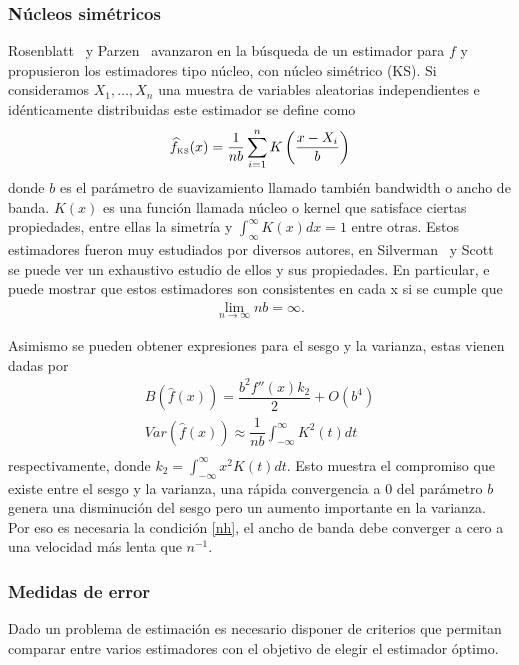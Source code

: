 \subsubsection{Núcleos simétricos}
Rosenblatt~\cite{Rosenblatt56}  y Parzen~\cite{Parzen62} avanzaron en la búsqueda de un estimador para $f$ y propusieron los estimadores tipo núcleo, con núcleo simétrico (KS). Si consideramos $X_1,\ldots,X_n$ una muestra de variables aleatorias independientes e idénticamente distribuidas este estimador se define como
\begin{align}
\label{KS}
\widehat{f}_\text{\tiny KS}(x)=\frac{1}{n b} \sum_{i=1}^n K \left(\dfrac{x-X_i}{b}\right)
\end{align}
donde $b$ es el parámetro de suavizamiento llamado también bandwidth o ancho de banda. $K(x)$ es una función llamada núcleo o kernel que satisface ciertas propiedades, entre ellas la simetría y $\int_{\infty}^{\infty} K(x)dx=1$ entre otras. Estos estimadores fueron muy estudiados por diversos autores, en Silverman~\cite{Silverman1986} y Scott~\cite{Scott1992} se puede ver un exhaustivo estudio de ellos y sus propiedades. En particular, e puede mostrar que estos estimadores son consistentes en cada x si se cumple que  
\begin{align}
\label{nh}
\lim\limits_{n\to\infty} nb=\infty.
\end{align}	

Asimismo se pueden obtener expresiones para el sesgo y la varianza, estas vienen dadas por
\begin{align}
\label{SesgoVar}
B(\widehat{f}(x))=\dfrac{b^2 f''(x) k_2}{2}+O(b^4)\\
Var(\widehat{f}(x))\approx \dfrac{1}{nb} \int_{-\infty}^{\infty} K^2(t)dt\\
\end{align}	
respectivamente, donde $k_2=\int_{-\infty}^{\infty} x^2 K(t)dt$. Esto muestra el compromiso que existe entre el sesgo y la varianza, una rápida convergencia a $0$ del parámetro $b$ genera una disminución del sesgo pero un aumento importante en la varianza. Por eso es necesaria la condición \eqref{nh}, el ancho de banda debe converger a cero a una velocidad más lenta que $n^{-1}.$ 

\subsubsection{Medidas de error}

Dado un problema de estimación es necesario disponer de criterios que permitan comparar entre varios estimadores con el objetivo de elegir el estimador óptimo. 

